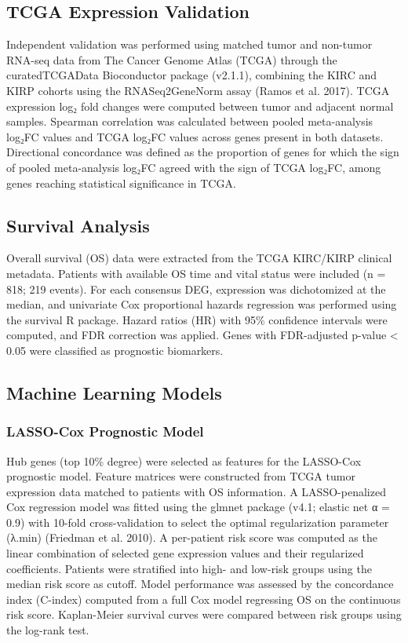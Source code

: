 \documentclass[
  12pt,
]{article}
\begin{document}
\subsection{TCGA Expression
Validation}\label{tcga-expression-validation}

Independent validation was performed using matched tumor and non-tumor
RNA-seq data from The Cancer Genome Atlas (TCGA) through the
curatedTCGAData Bioconductor package (v2.1.1), combining the KIRC and
KIRP cohorts using the RNASeq2GeneNorm assay (Ramos et al. 2017). TCGA
expression log₂ fold changes were computed between tumor and adjacent
normal samples. Spearman correlation was calculated between pooled
meta-analysis log₂FC values and TCGA log₂FC values across genes present
in both datasets. Directional concordance was defined as the proportion
of genes for which the sign of pooled meta-analysis log₂FC agreed with
the sign of TCGA log₂FC, among genes reaching statistical significance
in TCGA.

\subsection{Survival Analysis}\label{survival-analysis}

Overall survival (OS) data were extracted from the TCGA KIRC/KIRP
clinical metadata. Patients with available OS time and vital status were
included (n = 818; 219 events). For each consensus DEG, expression was
dichotomized at the median, and univariate Cox proportional hazards
regression was performed using the survival R package. Hazard ratios
(HR) with 95\% confidence intervals were computed, and FDR correction
was applied. Genes with FDR-adjusted p-value \textless{} 0.05 were
classified as prognostic biomarkers.

\subsection{Machine Learning Models}\label{machine-learning-models}

\subsubsection{LASSO-Cox Prognostic
Model}\label{lasso-cox-prognostic-model}

Hub genes (top 10\% degree) were selected as features for the LASSO-Cox
prognostic model. Feature matrices were constructed from TCGA tumor
expression data matched to patients with OS information. A
LASSO-penalized Cox regression model was fitted using the glmnet package
(v4.1; elastic net α = 0.9) with 10-fold cross-validation to select the
optimal regularization parameter (λ.min) (Friedman et al. 2010). A
per-patient risk score was computed as the linear combination of
selected gene expression values and their regularized coefficients.
Patients were stratified into high- and low-risk groups using the median
risk score as cutoff. Model performance was assessed by the concordance
index (C-index) computed from a full Cox model regressing OS on the
continuous risk score. Kaplan-Meier survival curves were compared
between risk groups using the log-rank test.
\end{document}
